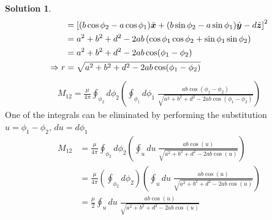 \documentclass[letter,12pt]{article}
\theoremstyle{definition}
\newtheorem*{sol}{Solution}
\begin{document}
\begin{enumerate}
\begin{sol}
\begin{align*}
                &=
                {\left[
                    (b \cos \phi_2 - a \cos \phi_1) \hat{\boldsymbol{x}}
                    +
                    (b \sin \phi_2 - a \sin \phi_1) \hat{\boldsymbol{y}}
                    -
                    d \hat{\boldsymbol{z}}
                \right]}^2
                \\
                &=
                a^2 + b^2 + d^2 - 2ab
                \left(
                    \cos \phi_1 \cos \phi_2 + \sin\phi_1 \sin\phi_2
                \right)
                \\
                &=
                a^2 + b^2 + d^2 - 2ab \cos(\phi_1 - \phi_2)
                \\
                \Rightarrow r &=
                \sqrt{a^2 + b^2 + d^2 - 2ab \cos(\phi_1 - \phi_2)}
            \end{align*}
            \begin{align*}
                M_{12} =
                \frac{\mu}{4 \pi}
                \oint_{\phi_2}
                d\phi_2
                \left(
                    \oint_{\phi_1}
                    d\phi_1\;
                    \frac
                    {ab\cos(\phi_1 - \phi_2)}
                    {\sqrt{a^2 + b^2 + d^2 - 2ab \cos(\phi_1 - \phi_2)}}
                \right)
            \end{align*}
            One of the integrals can be eliminated by performing the substitution
            $u = \phi_1 - \phi_2$, $du = d\phi_1$
            \begin{align*}
                M_{12} &=
                \frac{\mu}{4 \pi}
                \oint_{\phi_2}
                d\phi_2
                \left(
                    \oint_{u}
                    du\;
                    \frac
                    {ab\cos(u)}
                    {\sqrt{a^2 + b^2 + d^2 - 2ab \cos(u)}}
                \right)
                \\
                &=
                \frac{\mu}{4 \pi}
                \left(
                    \oint_{\phi_2}
                    d\phi_2
                \right)
                \left(
                    \oint_{u}
                    du\;
                    \frac
                    {ab\cos(u)}
                    {\sqrt{a^2 + b^2 + d^2 - 2ab \cos(u)}}
                \right)
                \\
                &=
                \frac{\mu}{2}
                \oint_{u}
                du\;
                \frac
                {ab\cos(u)}
                {\sqrt{a^2 + b^2 + d^2 - 2ab \cos(u)}}

\end{align*}
\end{sol}
\end{enumerate}
\end{document}
